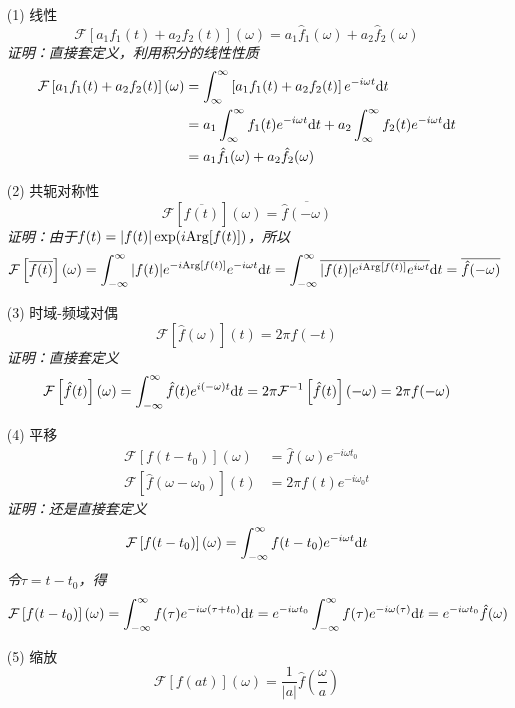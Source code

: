 \documentclass[main.tex]{subfiles}
\begin{document}
\begin{itemize}
    \item [(1)] 线性
    \[ \mathcal{F}\left[a_1f_1(t)+a_2f_2(t)\right](\omega) = a_1\hat{f}_1(\omega)+a_2\hat{f}_2(\omega)\]
    \textit{
        证明：直接套定义，利用积分的线性性质
    }
    \begin{align*} 
        \mathcal{F}\left[a_1f_1(t)+a_2f_2(t)\right](\omega) &= \int_{\infty}^{\infty}\left[a_1f_1(t)+a_2f_2(t)\right]e^{-i\omega t}{\rm d}t \\
        &= a_1\int_{\infty}^{\infty}f_1(t)e^{-i\omega t}{\rm d}t + a_2\int_{\infty}^{\infty}f_2(t)e^{-i\omega t}{\rm d}t \\
        &= a_1\hat{f}_1(\omega)+a_2\hat{f}_2(\omega)
    \end{align*}
    \item [(2)] 共轭对称性
    \[ \mathcal{F}\left[\overline{f(t)}\right](\omega) = \overline{\hat{f}(-\omega)}\]
    \textit{
        证明：由于\(f(t)=|f(t)|\exp(i{\rm Arg}[f(t)])\)，所以
    }
    \[\mathcal{F}\left[\overline{f(t)}\right](\omega) = \int_{-\infty}^{\infty}|f(t)|e^{-i{\rm Arg}[f(t)]}e^{-i\omega t}{\rm d}t = \int_{-\infty}^{\infty}\overline{|f(t)|e^{i{\rm Arg}[f(t)]}e^{i\omega t}}{\rm d}t = \overline{\hat{f}(-\omega)}\]
    \item [(3)] 时域-频域对偶
    \[ \mathcal{F}\left[\hat{f}(\omega)\right](t) = 2\pi f(-t)\]
    \textit{
        证明：直接套定义
    }
    \[\mathcal{F}\left[\hat{f}(t)\right](\omega) = \int_{-\infty}^{\infty}\hat{f}(t)e^{i(-\omega)t}{\rm d}t = 2\pi\mathcal{F}^{-1}\left[\hat{f}(t)\right](-\omega) = 2\pi f(-\omega)\]
    \item [(4)] 平移
    \begin{align*} 
        \mathcal{F}\left[f(t-t_0)\right](\omega) &= \hat{f}(\omega)e^{-i\omega t_0} \\
        \mathcal{F}\left[\hat{f}(\omega-\omega_0)\right](t) &= 2\pi f(t)e^{-i\omega_0t}
    \end{align*}
    \textit{
        证明：还是直接套定义
    }
    \[ \mathcal{F}\left[f(t-t_0)\right](\omega) = \int_{-\infty}^{\infty} f(t-t_0)e^{-i\omega t}{\rm d}t\]
    \textit{令\(\tau = t-t_0\)，得}
    \[ \mathcal{F}\left[f(t-t_0)\right](\omega) = \int_{-\infty}^{\infty} f(\tau)e^{-i\omega(\tau+t_0)}{\rm d}t = e^{-i\omega t_0}\int_{-\infty}^{\infty} f(\tau)e^{-i\omega(\tau)}{\rm d}t = e^{-i\omega t_0}\hat{f}(\omega) \]
    \item [(5)] 缩放
    \[ \mathcal{F}\left[f(at)\right](\omega) = \frac{1}{|a|}\hat{f}\left(\frac{\omega}{a}\right) \]

\end{itemize}
\end{document}
